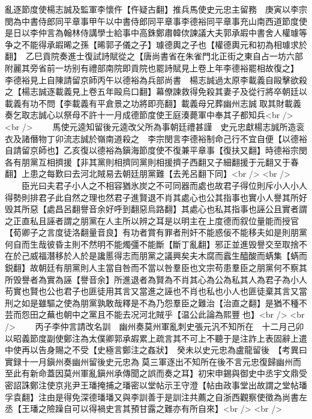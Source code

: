 亂逐節度使楊志誠及監軍李懷仵【仵疑古翻】推兵馬使史元忠主留務　庚寅以李宗閔為中書侍郎同平章事甲午以中書侍郎同平章事李德裕同平章事充山南西道節度使是日以李仲言為翰林侍講學士給事中高銖鄭肅韓佽諫議大夫郭承嘏中書舍人權璩等争之不能得承嘏晞之孫【晞郭子儀之子】璩德輿之子也【權德輿元和初為相璩求於翻】　乙巳貢院奏進士復試詩賦從之【唐尚書省在朱雀門北正街之東自占一坊六部附麗其旁省前一坊别有禮部南院即貢院也罷詩賦見上卷上年李德裕罷相故復之】　李德裕見上自陳請留京師丙午以德裕為兵部尚書　楊志誠過太原李載義自毆擊欲殺之【楊志誠逐載義見上卷五年毆烏口翻】幕僚諫救得免殺其妻子及從行將卒朝廷以載義有功不問【李載義有平倉景之功將即亮翻】載義母兄葬幽州志誠取其財載義奏乞取志誠心以祭母不許十一月成德節度使王庭湊薨軍中奉其子都知兵<br />
<br />
　　馬使元逵知留後元逵改父所為事朝廷禮甚謹　史元忠獻楊志誠所造衮衣及諸僭物丁卯流志誠於嶺南道殺之　李宗閔言李德裕制命己行不宜自便【以德裕自請留京師也】乙亥復以德裕為鎭海節度使不復兼平章事【復扶又翻】時德裕宗閔各有朋黨互相擠援【非其黨則相擠同黨則相援擠子西翻又子細翻援于元翻又于春翻】上患之每歎曰去河北賊易去朝廷朋黨難【去羌呂翻下同】<br />
<br />
　　臣光曰夫君子小人之不相容猶氷炭之不可同器而處也故君子得位則斥小人小人得勢則排君子此自然之理也然君子進賢退不肖其處心也公其指事也實小人譽其所好毁其所惡【處昌呂翻譽音余好呼到翻惡烏路翻】其處心也私其指事也誣公且實者謂之正直私且誣者謂之朋黨在人主所以辨之耳是以明主在上度德而叙位量能而授官【荀卿子之言度徒洛翻量音良】有功者賞有罪者刑奸不能惑佞不能移夫如是則朋黨何自而生哉彼昏主則不然明不能燭彊不能斷【斷丁亂翻】邪正並進毁譽交至取捨不在於己威福潛移於人於是讒慝得志而朋黨之議興矣夫木腐而蠧生醯酸而蜹集【蜹而鋭翻】故朝廷有朋黨則人主當自咎而不當以咎羣臣也文宗苟患羣臣之朋黨何不察其所毁譽者為實為誣【譽音余】所進退者為賢為不肖其心為公為私其人為君子為小人苟實也賢也公也君子也匪徒用其言又當進之誣也不肖也私也小人也匪徒棄其言又當刑之如是雖驅之使為朋黨孰敢哉釋是不為乃怨羣臣之難治【治直之翻】是猶不種不芸而怨田之蕪也朝中之黨且不能去况河北賊乎【温公此論為熙豐也】<br />
<br />
　　丙子李仲言請改名訓　幽州奏莫州軍亂刺史張元汎不知所在　十二月己卯以昭義節度副使鄭注為太僕卿郭承嘏累上疏言其不可上不聽于是注詐上表固辭上遣中使再以告身賜之不受【史極言鄭注之姦狀】　癸未以史元忠為盧龍留後　【考異曰實録十一月鎭州奏幽州留後史元忠為莫三軍逐出不知所在後不言元忠復歸幽州而至此有新命蓋因莫州軍亂鎭州承傳聞之誤而奏之耳】初宋申錫與御史中丞宇文鼎受密詔誅鄭注使京兆尹王璠掩捕之璠密以堂帖示王守澄【帖由政事堂出故謂之堂帖璠孚袁翻】注由是得免深德璠璠又與李訓善于是訓注共薦之自浙西觀察使徵為尚書左丞【王璠之險躁自可以得禍史言其預甘露之難亦有所自來】<br />
<br />
